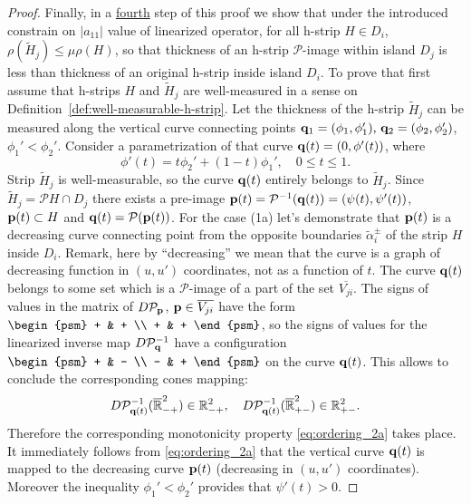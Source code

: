 \begin{proof}
	Finally, in a \underline{fourth} step of this proof we show that under the introduced constrain on $|a_{11}|$ value of linearized operator, for all h-strip $H \in D_i$, $\rho (\widetilde{H}_j) \le \mu \rho(H)$, so that thickness of an h-strip $\mathcal{P}$-image within island $D_j$ is less than thickness of an original h-strip inside island $D_i$.
	To prove that first assume that h-strips $H$ and $\widetilde{H}_j$ are well-measured in a sense on Definition~\ref{def:well-measurable-h-strip}.
	Let the thickness of the h-strip $\widetilde{H}_j$ can be measured along the vertical curve connecting points $\vb{q}_1 = (\phi_1, \phi_1'), \, \vb{q}_2 = (\phi_2, \phi_2')$, $\phi_1' < \phi_2'$.
	Consider a parametrization of that curve $\vb{q}(t) = (0, \phi'(t))$, where
	\begin{equation}
		\phi'(t) = t \phi_2' + (1 - t) \phi_1', \quad 0 \le t \le 1.
	\end{equation}
	Strip $\widetilde{H}_j$ is well-measurable, so the curve $\vb{q}(t)$ entirely belongs to $\widetilde{H}_j$.
	Since $\widetilde{H}_j = \mathcal{P} H \cap D_j$ there exists a pre-image $\vb{p}(t) = \mathcal{P}^{-1} (\vb{q}(t)) = (\psi(t), \psi'(t))$, $\vb{p}(t) \subset H$ and $\vb{q}(t) = \mathcal{P} (\vb{p}(t))$.
	For the case (1a) let's demonstrate that $\vb{p}(t)$ is a decreasing curve connecting point from the opposite boundaries $\widetilde{\alpha}_i^{\pm}$ of the strip $H$ inside $D_i$.
	Remark, here by ``decreasing'' we mean that the curve is a graph of decreasing function in $(u, u')$ coordinates, not as a function of $t$.
	The curve $\vb{q}(t)$ belongs to some set which is a $\mathcal{P}$-image of a part of the set $\overline{V_{ji}}$.
	The signs of values in the matrix of $D \mathcal{P}_{\vb{p}}$, $\vb{p} \in \overline{V_{ji}}$ have the form $\begin{psm} + & + \\ + & + \end{psm}$, so the signs of values for the linearized inverse map $D \mathcal{P}^{-1}_{\vb{q}}$ have a configuration $\begin{psm} + & - \\ - & + \end{psm}$ on the curve $\vb{q}(t)$.
	This allows to conclude the corresponding cones mapping:
	\begin{equation}
		D \mathcal{P}^{-1}_{\vb{q}(t)} (\overline{\mathbb{R}}_{-+}^2) \in \mathbb{R}_{-+}^2, \quad D \mathcal{P}^{-1}_{\vb{q}(t)} (\overline{\mathbb{R}}_{+-}^2) \in \mathbb{R}_{+-}^2.
	\label{eq:cones-backward}
	\end{equation}
	Therefore the corresponding monotonicity property \eqref{eq:ordering_2a} takes place.
	It immediately follows from \eqref{eq:ordering_2a} that the vertical curve $\vb{q}(t)$ is mapped to the decreasing curve $\vb{p}(t)$ (decreasing in $(u, u')$ coordinates).
	Moreover the inequality $\phi_1' < \phi_2'$ provides that $\psi'(t) > 0$.
	

\end{proof}
